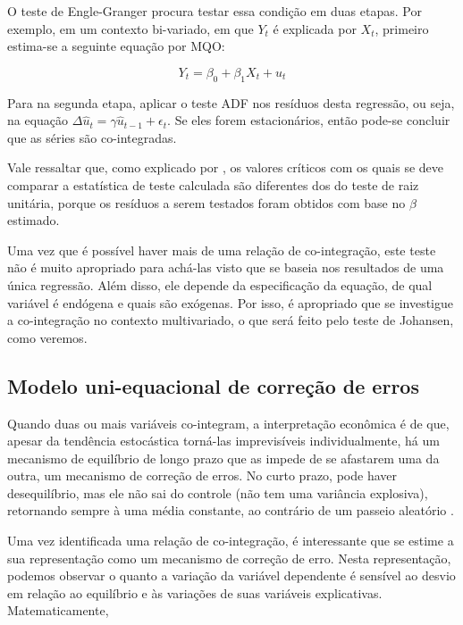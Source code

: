 \documentclass[a4paper,
               article,
               12pt,
               openany,
               oneside,
               english,
               brazil]{abntex2}
\numberwithin{equation}{section}
\begin{document}
    O teste de Engle-Granger procura testar essa condição em duas etapas. Por exemplo, em um contexto bi-variado, em que $ Y_t $ é explicada por $ X_t $, primeiro estima-se a seguinte equação por MQO:

    \begin{equation}
        Y_t = \beta_0 + \beta_1 X_t + u_t \label{engle-granger}
    \end{equation}

    Para na segunda etapa, aplicar o teste ADF nos resíduos desta regressão, ou seja, na equação $ \Delta \hat{u}_t = \gamma \hat{u}_{t-1} + \epsilon_{t} $. Se eles forem estacionários, então pode-se concluir que as séries são co-integradas.

    Vale ressaltar que, como explicado por \textcite[p.~756]{gujarati}, os valores críticos com os quais se deve comparar a estatística de teste calculada são diferentes dos do teste de raiz unitária, porque os resíduos a serem testados foram obtidos com base no $ \beta $ estimado.

    Uma vez que é possível haver mais de uma relação de co-integração, este teste não é muito apropriado para achá-las visto que se baseia nos resultados de uma única regressão. Além disso, ele depende da especificação da equação, de qual variável é endógena e quais são exógenas. Por isso, é apropriado que se investigue a co-integração no contexto multivariado, o que será feito pelo teste de Johansen, como veremos.

    \subsection{Modelo uni-equacional de correção de erros}

    Quando duas ou mais variáveis co-integram, a interpretação econômica é de que, apesar da tendência estocástica torná-las imprevisíveis individualmente, há um mecanismo de equilíbrio de longo prazo que as impede de se afastarem uma da outra, um mecanismo de correção de erros. No curto prazo, pode haver desequilíbrio, mas ele não sai do controle (não tem uma variância explosiva), retornando sempre à uma média constante, ao contrário de um passeio aleatório \textcite[757-758]{gujarati}.

    Uma vez identificada uma relação de co-integração, é interessante que se estime a sua representação como um mecanismo de correção de erro. Nesta representação, podemos observar o quanto a variação da variável dependente é sensível ao desvio em relação ao equilíbrio e às variações de suas variáveis explicativas. Matematicamente, 
\end{document}
